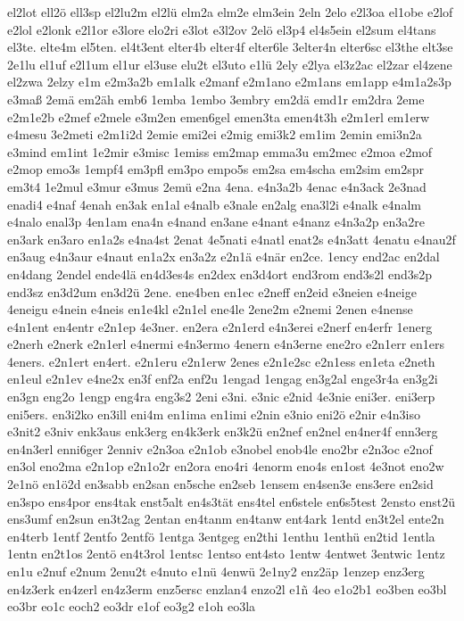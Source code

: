 {el2lot
ell2ö
ell3sp
el2lu2m
el2lü
elm2a
elm2e
elm3ein
2eln
2elo
e2l3oa
el1obe
e2lof
e2lol
e2lonk
e2l1or
e3lore
elo2ri
e3lot
e3l2ov
2elö
el3p4
el4s5ein
el2sum
el4tans
el3te.
elte4m
el5ten.
el4t3ent
elter4b
elter4f
elter6le
3elter4n
elter6sc
el3the
elt3se
2e1lu
el1uf
e2l1um
el1ur
el3use
elu2t
el3uto
e1lü
2ely
e2lya
el3z2ac
el2zar
el4zene
el2zwa
2elzy
e1m
e2m3a2b
em1alk
e2manf
e2m1ano
e2m1ans
em1app
e4m1a2s3p
e3maß
2emä
em2äh
emb6
1emba
1embo
3embry
em2dä
emd1r
em2dra
2eme
e2m1e2b
e2mef
e2mele
e3m2en
emen6gel
emen3ta
emen4t3h
e2m1erl
em1erw
e4mesu
3e2meti
e2m1i2d
2emie
emi2ei
e2mig
emi3k2
em1im
2emin
emi3n2a
e3mind
em1int
1e2mir
e3misc
1emiss
em2map
emma3u
em2mec
e2moa
e2mof
e2mop
emo3s
1empf4
em3pfl
em3po
empo5s
em2sa
em4scha
em2sim
em2spr
em3t4
1e2mul
e3mur
e3mus
2emü
e2na
4ena.
e4n3a2b
4enac
e4n3ack
2e3nad
enadi4
e4naf
4enah
en3ak
en1al
e4nalb
e3nale
en2alg
ena3l2i
e4nalk
e4nalm
e4nalo
enal3p
4en1am
ena4n
e4nand
en3ane
e4nant
e4nanz
e4n3a2p
en3a2re
en3ark
en3aro
en1a2s
e4na4st
2enat
4e5nati
e4natl
enat2s
e4n3att
4enatu
e4nau2f
en3aug
e4n3aur
e4naut
en1a2x
en3a2z
e2n1ä
e4när
en2ce.
1ency
end2ac
en2dal
en4dang
2endel
ende4lä
en4d3es4s
en2dex
en3d4ort
end3rom
end3s2l
end3s2p
end3sz
en3d2um
en3d2ü
2ene.
ene4ben
en1ec
e2neff
en2eid
e3neien
e4neige
4eneigu
e4nein
e4neis
en1e4kl
e2n1el
ene4le
2ene2m
e2nemi
2enen
e4nense
e4n1ent
en4entr
e2n1ep
4e3ner.
en2era
e2n1erd
e4n3erei
e2nerf
en4erfr
1energ
e2nerh
e2nerk
e2n1erl
e4nermi
e4n3ermo
4enern
e4n3erne
ene2ro
e2n1err
en1ers
4eners.
e2n1ert
en4ert.
e2n1eru
e2n1erw
2enes
e2n1e2sc
e2n1ess
en1eta
e2neth
en1eul
e2n1ev
e4ne2x
en3f
enf2a
enf2u
1engad
1engag
en3g2al
enge3r4a
en3g2i
en3gn
eng2o
1engp
eng4ra
eng3s2
2eni
e3ni.
e3nic
e2nid
4e3nie
eni3er.
eni3erp
eni5ers.
en3i2ko
en3ill
eni4m
en1ima
en1imi
e2nin
e3nio
eni2ö
e2nir
e4n3iso
e3nit2
e3niv
enk3aus
enk3erg
en4k3erk
en3k2ü
en2nef
en2nel
en4ner4f
enn3erg
en4n3erl
enni6ger
2enniv
e2n3oa
e2n1ob
e3nobel
enob4le
eno2br
e2n3oc
e2nof
en3ol
eno2ma
e2n1op
e2n1o2r
en2ora
eno4ri
4enorm
eno4s
en1ost
4e3not
eno2w
2e1nö
en1ö2d
en3sabb
en2san
en5sche
en2seb
1ensem
en4sen3e
ens3ere
en2sid
en3spo
ens4por
ens4tak
enst5alt
en4s3tät
ens4tel
en6stele
en6s5test
2ensto
enst2ü
ens3umf
en2sun
en3t2ag
2entan
en4tanm
en4tanw
ent4ark
1entd
en3t2el
ente2n
en4terb
1entf
2entfo
2entfö
1entga
3entgeg
en2thi
1enthu
1enthü
en2tid
1entla
1entn
en2t1os
2entö
en4t3rol
1entsc
1entso
ent4sto
1entw
4entwet
3entwic
1entz
en1u
e2nuf
e2num
2enu2t
e4nuto
e1nü
4enwü
2e1ny2
enz2äp
1enzep
enz3erg
en4z3erk
en4zerl
en4z3erm
enz5ersc
enzlan4
enzo2l
e1ñ
4eo
e1o2b1
eo3ben
eo3bl
eo3br
eo1c
eoch2
eo3dr
e1of
eo3g2
e1oh
eo3la
}
